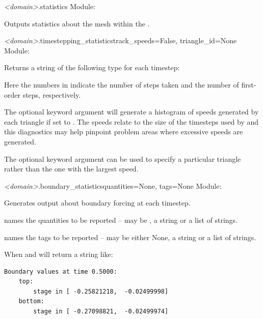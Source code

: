 \documentclass{manual}
\begin{document}
\begin{methoddesc}{\emph{<domain>}.statistics}{}
Module: 

Outputs statistics about the mesh within the .
\end{methoddesc}

\begin{methoddesc}{\emph{<domain>}.timestepping_statistics}{track_speeds=False, triangle_id=None}
Module: 

Returns a string of the following type for each timestep:\\

Here the numbers in  indicate the number of steps taken and
the number of first-order steps, respectively.

The optional keyword argument  will
generate a histogram of speeds generated by each triangle if set to . The
speeds relate to the size of the timesteps used by \anuga and
this diagnostics may help pinpoint problem areas where excessive speeds
are generated.

The optional keyword argument  can be used to specify a particular
triangle rather than the one with the largest speed.
\end{methoddesc}

\begin{methoddesc}{\emph{<domain>}.boundary_statistics}{quantities=None,
                                                      tags=None}
Module: 

Generates output about boundary forcing at each timestep.

 names the quantities to be reported -- may be ,
a string or a list of strings.

 names the tags to be reported -- may be either None, a string or a list of strings.

When  and 
will return a string like:

\begin{verbatim}
Boundary values at time 0.5000:
    top:
        stage in [ -0.25821218,  -0.02499998]
    bottom:
        stage in [ -0.27098821,  -0.02499974]
\end{verbatim}
\end{methoddesc}
\end{document}
